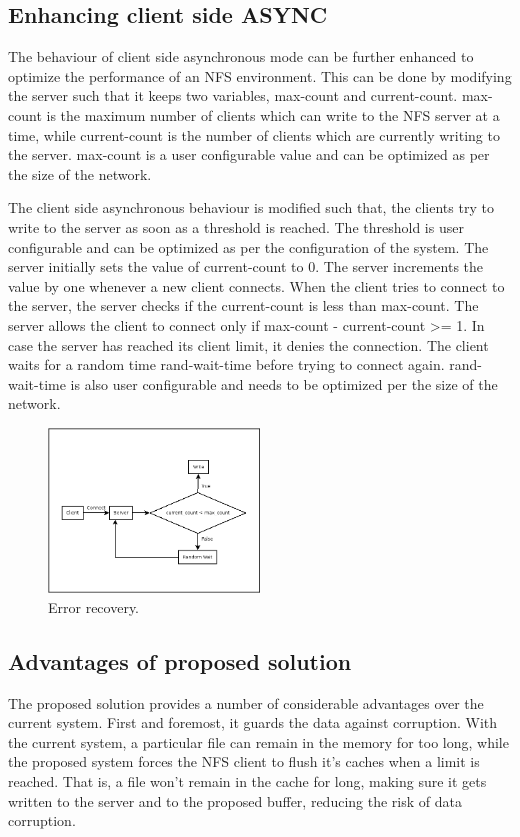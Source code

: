 \documentclass[conference]{IEEEtran}
\begin{document}
\subsection{Enhancing client side ASYNC }\label{SCM}
The behaviour of client side asynchronous mode can be further enhanced to 
optimize the performance of an NFS environment. This can be done by
modifying the server such that it keeps two variables, max-count and 
current-count. max-count is the maximum number of clients which can write 
to the NFS server at a time, while current-count is the number of clients 
which are currently writing to the server. max-count is a user configurable
value and can be optimized as per the size of the network.

The client side asynchronous behaviour is modified such that, the clients 
try to write to the server as soon as a threshold is reached. The threshold
is user configurable and can be optimized as per the configuration of the
system. The server initially sets the value of current-count to 0. The 
server increments the value by one whenever a new client connects. When the
client tries to connect to the server, the server checks if the
current-count is less than max-count. The server allows the client to
connect only if max-count - current-count >= 1. In case the server has
reached its client limit, it denies the connection. The client waits for a
random time rand-wait-time before trying to connect again. rand-wait-time
is also user configurable and needs to be optimized per the size of the
network.
\begin{figure}[htbp]
\centerline{\includegraphics[width=0.5\textwidth,natwidth=400,natheight=100]{enhancing_client_async.png}}
\caption{Error recovery.}
\label{fig}
\end{figure}

\subsection{Advantages of proposed solution}
The proposed solution provides a number of considerable advantages over the
current system. First and foremost, it guards the data against corruption.
With the current system, a particular file can remain in the memory for too
long, while the proposed system forces the NFS client to flush it's caches when 
a limit is reached. That is, a file won't remain in the cache for long, making
sure it gets written to the server and to the proposed buffer, reducing the
risk of data corruption.
\end{document}
